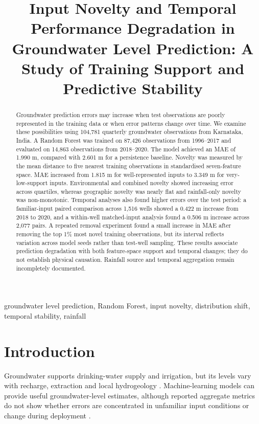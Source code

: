 \documentclass[conference]{IEEEtran}
\title{Input Novelty and Temporal Performance Degradation in Groundwater Level Prediction: A Study of Training Support and Predictive Stability}
\author{
\IEEEauthorblockN{Amulya P \quad Dhanush R \quad Anagha Kaushik \quad Thrupthi G D}
\IEEEauthorblockA{PES University\\Bengaluru, India}
}
\begin{document}
\maketitle

\begin{abstract}
Groundwater prediction errors may increase when test observations are poorly represented in the training data or when error patterns change over time. We examine these possibilities using 104,781 quarterly groundwater observations from Karnataka, India. A Random Forest was trained on 87,426 observations from 1996--2017 and evaluated on 14,863 observations from 2018--2020. The model achieved an MAE of 1.990 m, compared with 2.601 m for a persistence baseline. Novelty was measured by the mean distance to five nearest training observations in standardised seven-feature space. MAE increased from 1.815 m for well-represented inputs to 3.349 m for very-low-support inputs. Environmental and combined novelty showed increasing error across quartiles, whereas geographic novelty was nearly flat and rainfall-only novelty was non-monotonic. Temporal analyses also found higher errors over the test period: a familiar-input paired comparison across 1,516 wells showed a 0.422 m increase from 2018 to 2020, and a within-well matched-input analysis found a 0.506 m increase across 2,077 pairs. A repeated removal experiment found a small increase in MAE after removing the top 1\% most novel training observations, but its interval reflects variation across model seeds rather than test-well sampling. These results associate prediction degradation with both feature-space support and temporal changes; they do not establish physical causation. Rainfall source and temporal aggregation remain incompletely documented.
\end{abstract}

\begin{IEEEkeywords}
groundwater level prediction, Random Forest, input novelty, distribution shift, temporal stability, rainfall
\end{IEEEkeywords}

\section{Introduction}
Groundwater supports drinking-water supply and irrigation, but its levels vary with recharge, extraction and local hydrogeology \cite{famiglietti,rodell}. Machine-learning models can provide useful groundwater-level estimates, although reported aggregate metrics do not show whether errors are concentrated in unfamiliar input conditions or change during deployment \cite{rajaee,wunsch,sahoo}.
\end{document}
